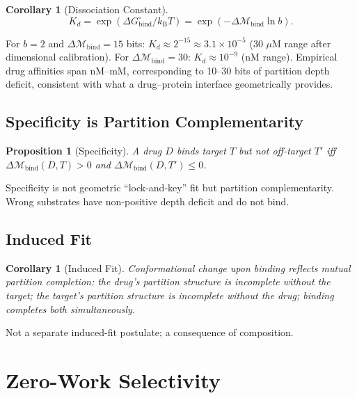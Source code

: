 \documentclass[twocolumn,10pt,a4paper]{article}
\newtheorem{proposition}[theorem]{Proposition}
\newtheorem{corollary}[theorem]{Corollary}
\theoremstyle{definition}
\theoremstyle{remark}
\newcommand{\kB}{k_{\mathrm{B}}}
\newcommand{\Depth}{\mathcal{M}}
\begin{document}
\begin{corollary}[Dissociation Constant]
\label{cor:kd}
\begin{equation}
    K_d = \exp(\Delta G^\circ_{\mathrm{bind}}/\kB T) = \exp(-\Delta\Depth_{\mathrm{bind}}\ln b).
\end{equation}
\end{corollary}

For $b=2$ and $\Delta\Depth_{\mathrm{bind}} = 15$ bits: $K_d \approx 2^{-15}\approx 3.1\times 10^{-5}$ (30 $\mu$M range after dimensional calibration). For $\Delta\Depth_{\mathrm{bind}} = 30$: $K_d\approx 10^{-9}$ (nM range). Empirical drug affinities span nM--mM, corresponding to 10--30 bits of partition depth deficit, consistent with what a drug--protein interface geometrically provides.

\subsection{Specificity is Partition Complementarity}

\begin{proposition}[Specificity]
A drug $D$ binds target $T$ but not off-target $T'$ iff $\Delta\Depth_{\mathrm{bind}}(D,T) > 0$ and $\Delta\Depth_{\mathrm{bind}}(D,T') \leq 0$.
\end{proposition}

Specificity is not geometric ``lock-and-key'' fit but partition complementarity. Wrong substrates have non-positive depth deficit and do not bind.

\subsection{Induced Fit}

\begin{corollary}[Induced Fit]
Conformational change upon binding reflects mutual partition completion: the drug's partition structure is incomplete without the target; the target's partition structure is incomplete without the drug; binding completes both simultaneously.
\end{corollary}

Not a separate induced-fit postulate; a consequence of composition.

\section{Zero-Work Selectivity}
\end{document}
